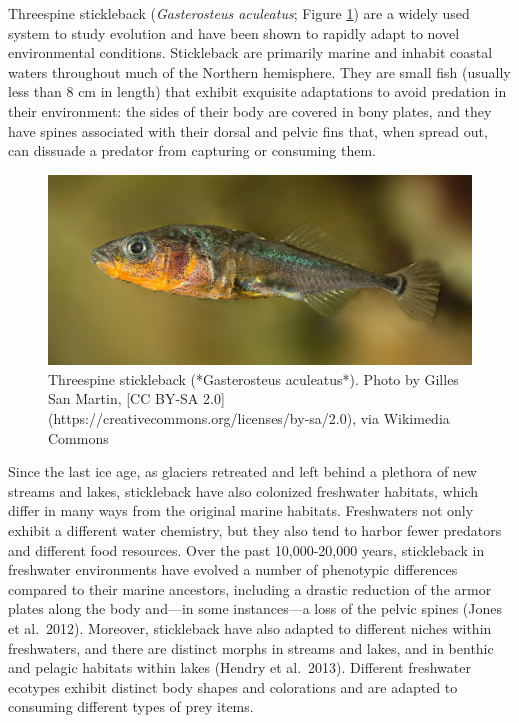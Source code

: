 \documentclass[
]{book}
\begin{document}
Threespine stickleback (\emph{Gasterosteus aculeatus}; Figure \ref{fig:stickleback}) are a widely used system to study evolution and have been shown to rapidly adapt to novel environmental conditions. Stickleback are primarily marine and inhabit coastal waters throughout much of the Northern hemisphere. They are small fish (usually less than 8 cm in length) that exhibit exquisite adaptations to avoid predation in their environment: the sides of their body are covered in bony plates, and they have spines associated with their dorsal and pelvic fins that, when spread out, can dissuade a predator from capturing or consuming them.

\begin{figure}
\includegraphics[width=1\linewidth]{images/Three-spined_stickleback} \caption{Threespine stickleback (*Gasterosteus aculeatus*). Photo by Gilles San Martin, [CC BY-SA 2.0](https://creativecommons.org/licenses/by-sa/2.0), via Wikimedia Commons}\label{fig:stickleback}
\end{figure}

Since the last ice age, as glaciers retreated and left behind a plethora of new streams and lakes, stickleback have also colonized freshwater habitats, which differ in many ways from the original marine habitats. Freshwaters not only exhibit a different water chemistry, but they also tend to harbor fewer predators and different food resources. Over the past 10,000-20,000 years, stickleback in freshwater environments have evolved a number of phenotypic differences compared to their marine ancestors, including a drastic reduction of the armor plates along the body and---in some instances---a loss of the pelvic spines (Jones et al.~2012). Moreover, stickleback have also adapted to different niches within freshwaters, and there are distinct morphs in streams and lakes, and in benthic and pelagic habitats within lakes (Hendry et al.~2013). Different freshwater ecotypes exhibit distinct body shapes and colorations and are adapted to consuming different types of prey items.
\end{document}
